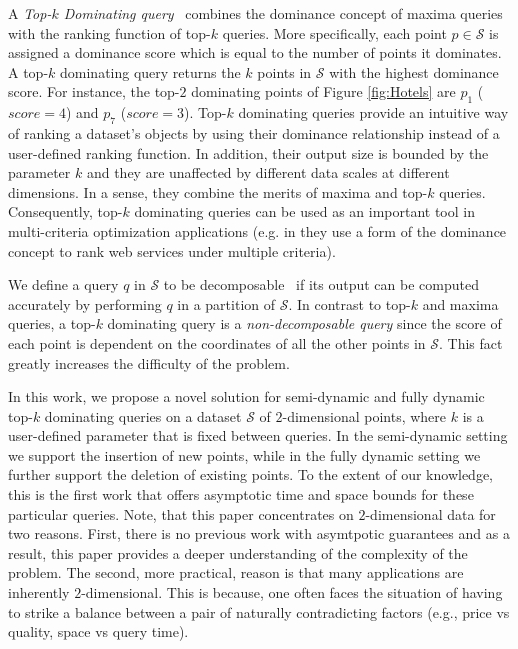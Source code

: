 \documentclass{llncs}
\begin{document}
A \emph{Top-$k$ Dominating query}~\cite{Papadias05} combines the dominance concept of maxima queries with the ranking function of top-$k$ queries. More specifically, each point $p\in\mathcal{S}$ is assigned a dominance score which is equal to the number of points it dominates. A top-$k$ dominating query returns the $k$ points in $\mathcal{S}$ with the highest dominance score. For instance, the top-$2$ dominating points of Figure \ref{fig:Hotels} are $p_1$ ($score = 4$) and $p_7$ ($score = 3$). Top-$k$ dominating queries provide an intuitive way of ranking a dataset's objects by using their dominance relationship instead of a user-defined ranking function. In addition, their output size is bounded by the parameter $k$ and they are unaffected by different data scales at different dimensions. In a sense, they combine the merits of maxima and top-$k$ queries. Consequently, top-$k$ dominating queries can be used as an important tool in multi-criteria optimization applications (e.g. in \cite{SkoutasSSKS09} they use a form of the dominance concept to rank web services under multiple criteria).

We define a query $q$ in $\mathcal{S}$ to be decomposable~\cite{BenSax80} if its output can be computed accurately by performing $q$ in a partition of $\mathcal{S}$. In contrast to top-$k$ and maxima queries, a top-$k$ dominating query is a \emph{non-decomposable query} since the score of each point is dependent on the coordinates of all the other points in $\mathcal{S}$. This fact greatly increases the difficulty of the problem.

In this work, we propose a novel solution for semi-dynamic and fully dynamic top-$k$ dominating queries on a dataset $\mathcal{S}$ of $2$-dimensional points, where $k$ is a user-defined parameter that is fixed between queries. In the semi-dynamic setting we support the insertion of new points, while in the fully dynamic setting we further support the deletion of existing points. To the extent of our knowledge, this is the first work that offers asymptotic time and space bounds for these particular queries. Note, that this paper concentrates on $2$-dimensional data for two reasons. First, there is no previous work with asymtpotic guarantees and as a result, this paper provides a deeper understanding of the complexity of the problem. The second, more practical, reason is that many applications are inherently $2$-dimensional. This is because, one often faces the situation of having to strike a balance between a pair of naturally contradicting
factors (e.g., price vs quality, space vs query time).
\end{document}
